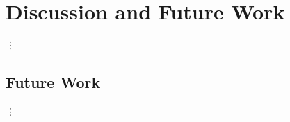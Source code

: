\section{Discussion and Future Work}
\label{sec:discussion}

\vdots

\subsection{Future Work}

\vdots